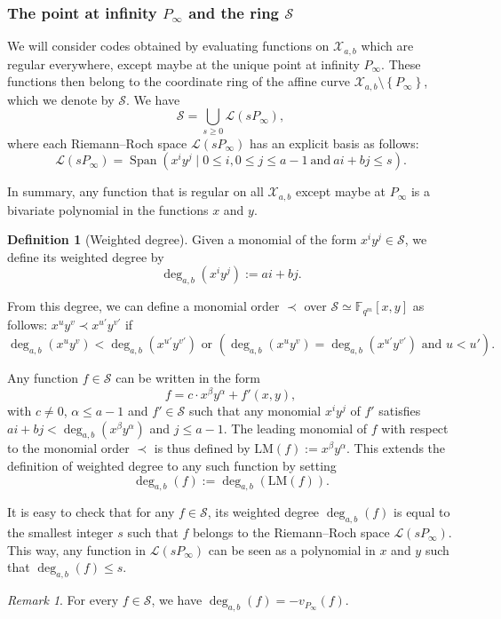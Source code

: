 \documentclass[a4paper]{amsart}
\theoremstyle{definition}
\newtheorem{definition}[thm]{Definition}
\theoremstyle{remark}
\newtheorem{remark}[thm]{Remark}
\newcommand{\calL}{\mathcal{L}}
\newcommand{\calS}{\mathcal{S}}
\newcommand{\calX}{\mathcal{X}}
\newcommand{\fqm}{\mathbb{F}_{q^m}}
\newcommand{\set}[1]{\left\{#1\right\}}
\newcommand{\Span}[1]{\operatorname{Span}\left(#1\right)}
\newcommand{\degab}[1]{\deg_{a,b}\left(#1\right)}
\begin{document}
\subsubsection{The point at infinity $P_\infty$ and the ring $\calS$}

We will consider codes obtained by evaluating functions on $\calX_{a,b}$ which are regular everywhere, except maybe at the unique point at infinity $P_\infty$. These functions then belong to the coordinate ring of the affine curve $\calX_{a,b} \setminus \set{P_\infty}$, which we denote by $\calS$. We have
\begin{equation}\label{eq:O_Pinf}
\calS=\bigcup_{s \geq 0} \calL(s P_\infty),
\end{equation} %
where each Riemann--Roch space $\calL(s P_\infty)$ has an explicit basis as follows:
\begin{equation} \label{eq:basis_L(sP_inf)}
    \calL(sP_{\infty}) = \Span{x^iy^j \mid 0 \leq i, 0\leq j\leq a-1 \ \mathrm{and} \ ai+bj \leq s}.
\end{equation}

In summary, any function that is regular on all $\calX_{a,b}$ except maybe at $P_\infty$ is a bivariate polynomial in the functions $x$ and $y$. 

\begin{definition}[Weighted degree] 
Given a monomial of the form $x^iy^j \in \calS$, we define its weighted degree by
\[ \degab{x^iy^j} := ai+bj.\]

From this degree, we can define a monomial order $\prec$ over $\calS \simeq \fqm[x,y]$ as follows: $x^uy^v \prec x^{u'}y^{v'}$ if
\begin{equation}\label{eq:def_mon_order}
\degab{x^uy^v} < \degab{x^{u'}y^{v'}} \text{ or } \left(\degab{x^uy^v} = \degab{x^{u'}y^{v'}}  \text{ and } u < u'\right).
\end{equation}

%
Any function $f \in \calS$ can be written in the form $$f = c \cdot x^{\beta}y^{\alpha} + f'(x,y),$$
with $c \neq 0$, $\alpha \leq a-1$ and $f' \in \calS$ such that any monomial $x^iy^j$ of $f'$ satisfies $ai+bj < \degab{x^{\beta}y^{\alpha}}$ and $j \leq a-1$. The leading monomial of $f$ with respect to the monomial order $\prec$ is thus defined by $\mathrm{LM}(f) := x^{\beta}y^{\alpha}$. This extends the definition of weighted degree to any such function by setting 
\[\degab{f} := \degab{\mathrm{LM}(f)}.\]
\end{definition}

It is easy to check that for any $f \in \calS$, its weighted degree $\degab{f}$ is equal to the smallest integer $s$ such that $f$ belongs to the Riemann--Roch space $\calL(sP_{\infty})$.
%
This way, any function in $\calL(sP_\infty)$ can be seen as a polynomial in $x$ and $y$ such that $\degab{f}\leq s$. 
\begin{remark} \label{rq:link_degab_valuation}
For every $f \in \calS$, we have $\degab{f}=-v_{P_\infty}(f)$.
\end{remark}
\end{document}
